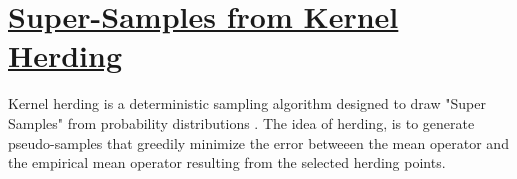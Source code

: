\section{\href{https://arxiv.org/pdf/1203.3472.pdf}{Super-Samples from Kernel Herding}}

Kernel herding is a deterministic sampling algorithm designed to draw "Super Samples" from probability distributions \cite{supersamples}. The idea of herding, is to generate pseudo-samples that greedily minimize the error betweeen the mean operator and the empirical mean operator resulting from the selected herding points.


